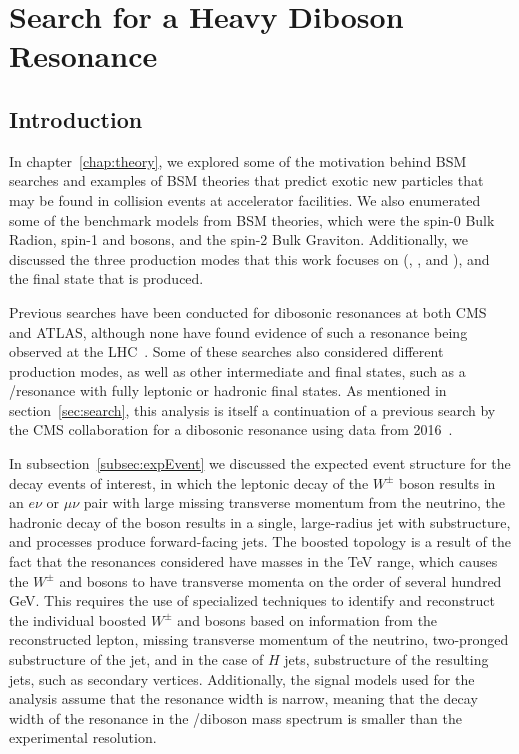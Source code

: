 
\chapter{Search for a Heavy Diboson Resonance}
\label{chap:analysis}

\section{Introduction}

In chapter~\ref{chap:theory}, we explored some of the motivation behind BSM searches and examples of BSM theories that predict exotic new particles that may be found in collision events at accelerator facilities.
We also enumerated some of the benchmark models from BSM theories, which were the spin-0 Bulk Radion, spin-1 \Wpr and \Zpr bosons, and the spin-2 Bulk Graviton.
Additionally, we discussed the three production modes that this work focuses on (\VBF, \ggF, and \DY), and the final state that is produced.

Previous searches have been conducted for dibosonic resonances at both CMS and ATLAS, although none have found evidence of such a resonance being observed at the LHC~\cite{Aaboud_18,Aaboud_18_2,Aad_15,Khachatryan_14,Sirunyan_17,Sirunyan_17_2,Aad:2020ddw}.
Some of these searches also considered different production modes, as well as other intermediate and final states, such as a \ZZ/\ZH resonance with fully leptonic or hadronic final states.
As mentioned in section~\ref{sec:search}, this analysis is itself a continuation of a previous search by the CMS collaboration for a dibosonic resonance using data from 2016~\cite{Sirunyan_18}.

In subsection~\ref{subsec:expEvent} we discussed the expected event structure for the decay events of interest, in which the leptonic decay of the $W^\pm$ boson results in an $e\nu$ or $\mu\nu$ pair with large missing transverse momentum from the neutrino, the hadronic decay of the \VorH boson results in a single, large-radius jet with substructure, and \VBF processes produce forward-facing jets.
The boosted topology is a result of the fact that the resonances considered have masses in the TeV range, which causes the $W^\pm$ and \VorH bosons to have transverse momenta on the order of several hundred GeV.
This requires the use of specialized techniques to identify and reconstruct the individual boosted $W^\pm$ and \VorH bosons based on information from the reconstructed lepton, missing transverse momentum of the neutrino, two-pronged substructure of the jet, and in the case of $H$ jets, substructure of the resulting \bbbar jets, such as secondary vertices.
Additionally, the signal models used for the analysis assume that the resonance width is narrow, meaning that the decay width of the resonance in the \WV/\WH diboson mass spectrum is smaller than the experimental resolution.

